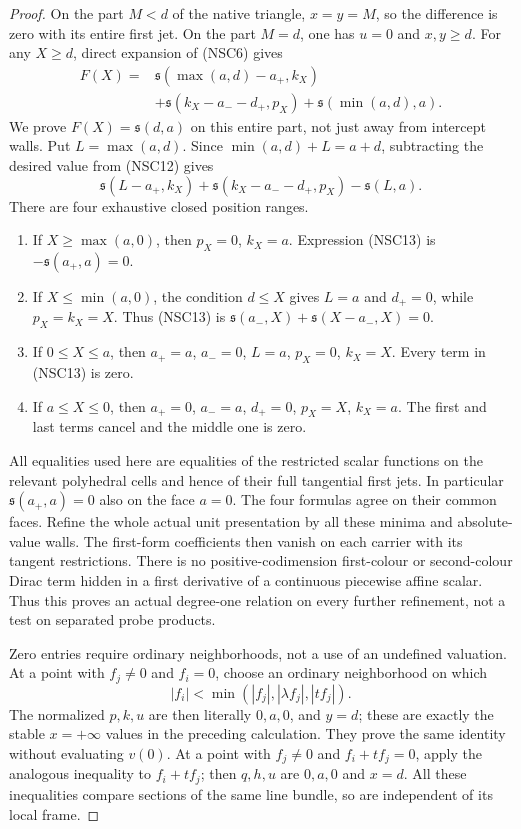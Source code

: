 \begin{proof}
On the part $M<d$ of the native triangle, $x=y=M$,
so the difference is zero with its entire first jet.
On the part $M=d$, one has $u=0$ and $x,y\geq d$.
For any $X\geq d$, direct expansion of (NSC6) gives
\[
 \begin{split}
 F(X)={}&\mathfrak s(\max(a,d)-a_+,k_X)\\
        &+\mathfrak s(k_X-a_--d_+,p_X)
                           +\mathfrak s(\min(a,d),a).
 \end{split}
 \tag{NSC12}
\]
We prove $F(X)=\mathfrak s(d,a)$ on this entire part,
not just away from intercept walls.  Put $L=\max(a,d)$.
Since $\min(a,d)+L=a+d$, subtracting the desired value
from (NSC12) gives
\[
 \mathfrak s(L-a_+,k_X)
       +\mathfrak s(k_X-a_--d_+,p_X)-\mathfrak s(L,a).
 \tag{NSC13}
\]
There are four exhaustive closed position ranges.
\begin{enumerate}
\item If $X\geq\max(a,0)$, then $p_X=0$, $k_X=a$.
      Expression (NSC13) is $-\mathfrak s(a_+,a)=0$.
\item If $X\leq\min(a,0)$, the condition $d\leq X$ gives
      $L=a$ and $d_+=0$, while $p_X=k_X=X$.
      Thus (NSC13) is
      $\mathfrak s(a_-,X)+\mathfrak s(X-a_-,X)=0$.
\item If $0\leq X\leq a$, then $a_+=a$, $a_-=0$,
      $L=a$, $p_X=0$, $k_X=X$.  Every term in (NSC13)
      is zero.
\item If $a\leq X\leq0$, then $a_+=0$, $a_-=a$,
      $d_+=0$, $p_X=X$, $k_X=a$.  The first and last
      terms cancel and the middle one is zero.
\end{enumerate}
All equalities used here are equalities of the restricted
scalar functions on the relevant polyhedral cells and hence
of their full tangential first jets.  In particular
$\mathfrak s(a_+,a)=0$ also on the face $a=0$.
The four formulas agree on their common faces.
Refine the whole actual unit presentation by all these
minima and absolute-value walls.  The first-form coefficients
then vanish on each carrier with its tangent restrictions.
There is no positive-codimension first-colour or second-colour
Dirac term hidden in a first derivative of a continuous
piecewise affine scalar.  Thus this proves an actual
degree-one relation on every further refinement, not a
test on separated probe products.

Zero entries require ordinary neighborhoods, not a use of
an undefined valuation.  At a point with $f_j\ne0$ and
$f_i=0$, choose an ordinary neighborhood on which
\[
 |f_i|<\min(|f_j|,|\lambda f_j|,|t f_j|).
 \tag{NSC14}
\]
The normalized $p,k,u$ are then literally $0,a,0$, and
$y=d$; these are exactly the stable $x=+\infty$ values
in the preceding calculation.  They prove the same
identity without evaluating $v(0)$.
At a point with $f_j\ne0$ and $f_i+t f_j=0$, apply
the analogous inequality to $f_i+t f_j$; then
$q,h,u$ are $0,a,0$ and $x=d$.
All these inequalities compare sections of the same line
bundle, so are independent of its local frame.


\end{proof}
